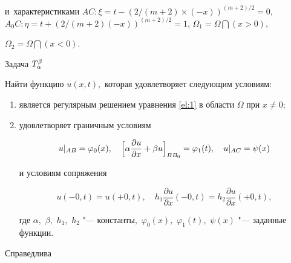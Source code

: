и~характеристиками $AC:\xi=t-(2/(m+2)\times(-x))^{(m+2)/2}=0$,  $A_0C:\eta=t+(2/(m+2)(-x))^{(m+2)/2}=1$, $\Omega_{1}=\Omega\bigcap(x>0)$,

$\Omega_{2}=\Omega\bigcap(x<0)$.



\begin{newthm}{Задача $\sc T_\alpha^\beta$}

Найти функцию $u(x,t),$ которая удовлетворяет следующим условиям\/{\rm:}

\begin{enumerate}

\item[\rm 1)] является регулярным решением уравнения \eqref{el:1} в области $\Omega$ при $x\neq 0$\/{\rm;}

\item[\rm 2)] удовлетворяет граничным условиям

\begin{equation} \label{el:2}

 u|_{AB}=\varphi_0(x), \quad  \Bigl[\alpha\frac{\partial u}{\partial x}+\beta

 u\Bigr]_{BB_0}=\varphi_1(t), \quad  u|_{AC}=\psi(x)

\end{equation}

и условиям сопряжения

\begin{equation} \label{el:3}

u(-0,t)=u(+0,t), \quad h_1\frac{\partial u}{\partial x}(-0,t)=h_2\frac{\partial u}{\partial x}(+0,t),

\end{equation}

где $\alpha,$ $\beta,$ $h_1,$ $h_2$ "--- константы$,$ $\varphi_0(x),$ $\varphi_1(t),$ $\psi(x)$ "--- заданные функции\rm.

\end{enumerate}

\end{newthm}



Справедлива

